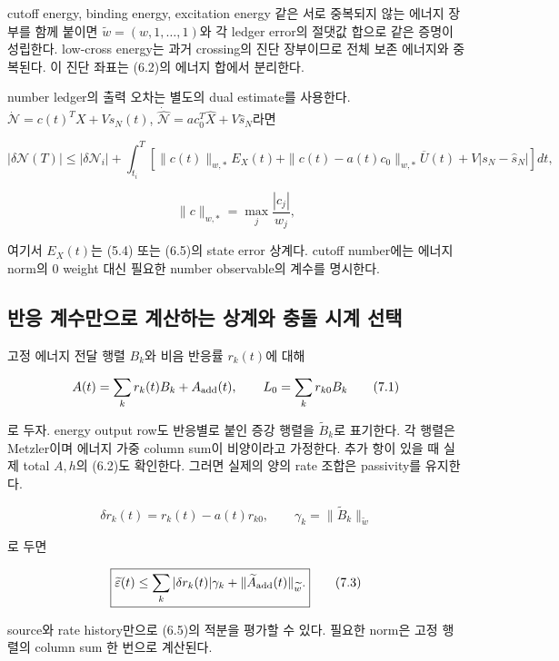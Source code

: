 \documentclass[11pt,a4paper]{article}
\begin{document}
cutoff energy, binding energy, excitation energy 같은 서로 중복되지 않는 에너지 장부를 함께 붙이면 \(\widetilde w=(w,1,\ldots,1)\)와 각 ledger error의 절댓값 합으로 같은 증명이 성립한다. low-cross energy는 과거 crossing의 진단 장부이므로 전체 보존 에너지와 중복된다. 이 진단 좌표는 (6.2)의 에너지 합에서 분리한다.

number ledger의 출력 오차는 별도의 dual estimate를 사용한다. \(\dot{\mathcal N}=c(t)^TX+V s_N(t)\), \(\dot{\widehat{\mathcal N}}=a c_0^T\widehat X+V\widehat s_N\)라면

\[
|\delta\mathcal N(T)|
\le|\delta\mathcal N_i|+
\int_{t_i}^{T}
\left[
\|c(t)\|_{w,*}E_X(t)
+\|c(t)-a(t)c_0\|_{w,*}\overline U(t)
+V|s_N-\widehat s_N|
\right]dt,
\tag{6.6}
\]

\[
\|c\|_{w,*}=\max_j\frac{|c_j|}{w_j},
\tag{6.7}
\]

여기서 \(E_X(t)\)는 (5.4) 또는 (6.5)의 state error 상계다. cutoff number에는 에너지 norm의 0 weight 대신 필요한 number observable의 계수를 명시한다.

\hypertarget{uxbc18uxc751-uxacc4uxc218uxb9ccuxc73cuxb85c-uxacc4uxc0b0uxd558uxb294-uxc0c1uxacc4uxc640-uxcda9uxb3cc-uxc2dcuxacc4-uxc120uxd0dd}{%
\subsection{반응 계수만으로 계산하는 상계와 충돌 시계 선택}\label{uxbc18uxc751-uxacc4uxc218uxb9ccuxc73cuxb85c-uxacc4uxc0b0uxd558uxb294-uxc0c1uxacc4uxc640-uxcda9uxb3cc-uxc2dcuxacc4-uxc120uxd0dd}}

고정 에너지 전달 행렬 \(B_k\)와 비음 반응률 \(r_k(t)\)에 대해

\[
A(t)=\sum_k r_k(t)B_k+A_{\rm add}(t),\qquad
L_0=\sum_k r_{k0}B_k
\tag{7.1}
\]

로 두자. energy output row도 반응별로 붙인 증강 행렬을 \(\widetilde B_k\)로 표기한다. 각 행렬은 Metzler이며 에너지 가중 column sum이 비양이라고 가정한다. 추가 항이 있을 때 실제 total \(A,h\)의 (6.2)도 확인한다. 그러면 실제의 양의 rate 조합은 passivity를 유지한다.

\[
\delta r_k(t)=r_k(t)-a(t)r_{k0},\qquad
\gamma_k=\|\widetilde B_k\|_{\widetilde w}
\tag{7.2}
\]

로 두면

\[
\boxed{
\widetilde\varepsilon(t)
\le\sum_k|\delta r_k(t)|\gamma_k
+\|\widetilde A_{\rm add}(t)\|_{\widetilde w}.
}
\tag{7.3}
\]

source와 rate history만으로 (6.5)의 적분을 평가할 수 있다. 필요한 norm은 고정 행렬의 column sum 한 번으로 계산된다.
\end{document}
